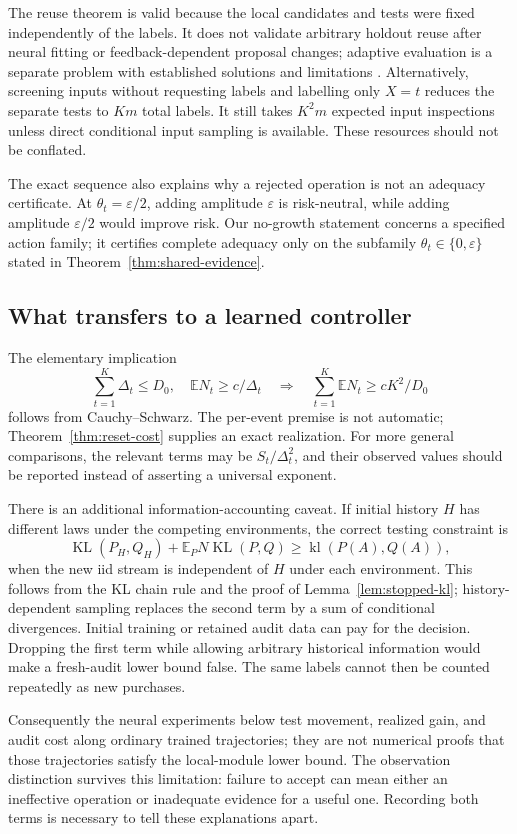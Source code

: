 The reuse theorem is valid because the local candidates and tests were
fixed independently of the labels. It does not validate arbitrary
holdout reuse after neural fitting or feedback-dependent proposal changes;
adaptive evaluation is a separate problem with established solutions and
limitations \cite{blum2015}. Alternatively, screening inputs without
requesting labels and labelling only $X=t$ reduces the separate tests to
$Km$ total labels. It still takes $K^2m$ expected input inspections unless
direct conditional input sampling is available. These resources should
not be conflated.

The exact sequence also explains why a rejected operation is not an
adequacy certificate. At $\theta_t=\varepsilon/2$, adding amplitude
$\varepsilon$ is risk-neutral, while adding amplitude $\varepsilon/2$
would improve risk. Our no-growth statement concerns a specified action
family; it certifies complete adequacy only on the subfamily
$\theta_t\in\{0,\varepsilon\}$ stated in
Theorem~\ref{thm:shared-evidence}.

\subsection{What transfers to a learned controller}

The elementary implication
\[
 \sum_{t=1}^K\Delta_t\le D_0,\quad
 \mathbb EN_t\ge c/\Delta_t
 \quad\Longrightarrow\quad
 \sum_{t=1}^K\mathbb EN_t\ge cK^2/D_0
\]
follows from Cauchy--Schwarz. The per-event premise is not automatic;
Theorem~\ref{thm:reset-cost} supplies an exact realization. For more general
comparisons, the relevant terms may be $S_t/\Delta_t^2$, and their observed
values should be reported instead of asserting a universal exponent.

There is an additional information-accounting caveat. If initial history
$H$ has different laws under the competing environments, the correct
testing constraint is
\begin{equation}
 \operatorname{KL}(P_H,Q_H)+
 \mathbb E_PN\operatorname{KL}(P,Q)
 \ge\operatorname{kl}(P(A),Q(A)),
 \label{eq:history-kl}
\end{equation}
when the new iid stream is independent of $H$ under each environment.
This follows from the KL chain rule and the proof of
Lemma~\ref{lem:stopped-kl}; history-dependent sampling replaces the second
term by a sum of conditional divergences. Initial training or retained
audit data can pay for the decision. Dropping the first term while allowing
arbitrary historical information would make a fresh-audit lower bound
false. The same labels cannot then be counted repeatedly as new purchases.

Consequently the neural experiments below test movement, realized gain,
and audit cost along ordinary trained trajectories; they are not numerical
proofs that those trajectories satisfy the local-module lower bound.
The observation distinction survives this limitation: failure to accept
can mean either an ineffective operation or inadequate evidence for a useful
one. Recording both terms is necessary to tell these explanations apart.
